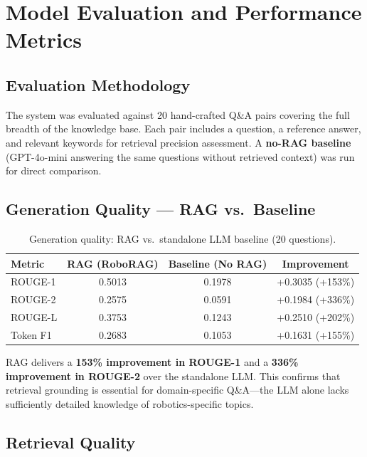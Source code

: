 \documentclass[12pt, a4paper]{article}
\begin{document}
\section{Model Evaluation and Performance Metrics}

\subsection{Evaluation Methodology}

The system was evaluated against 20 hand-crafted Q\&A pairs covering the full breadth of the knowledge base. Each pair includes a question, a reference answer, and relevant keywords for retrieval precision assessment. A \textbf{no-RAG baseline} (GPT-4o-mini answering the same questions without retrieved context) was run for direct comparison.

\subsection{Generation Quality --- RAG vs.\ Baseline}

\begin{table}[h]
\centering
\begin{tabular}{@{}lccc@{}}
\toprule
\textbf{Metric} & \textbf{RAG (RoboRAG)} & \textbf{Baseline (No RAG)} & \textbf{Improvement} \\
\midrule
ROUGE-1   & 0.5013 & 0.1978 & +0.3035 (+153\%) \\
ROUGE-2   & 0.2575 & 0.0591 & +0.1984 (+336\%) \\
ROUGE-L   & 0.3753 & 0.1243 & +0.2510 (+202\%) \\
Token F1  & 0.2683 & 0.1053 & +0.1631 (+155\%) \\
\bottomrule
\end{tabular}
\caption{Generation quality: RAG vs.\ standalone LLM baseline (20 questions).}
\end{table}

RAG delivers a \textbf{153\% improvement in ROUGE-1} and a \textbf{336\% improvement in ROUGE-2} over the standalone LLM. This confirms that retrieval grounding is essential for domain-specific Q\&A---the LLM alone lacks sufficiently detailed knowledge of robotics-specific topics.

\subsection{Retrieval Quality}
\end{document}
